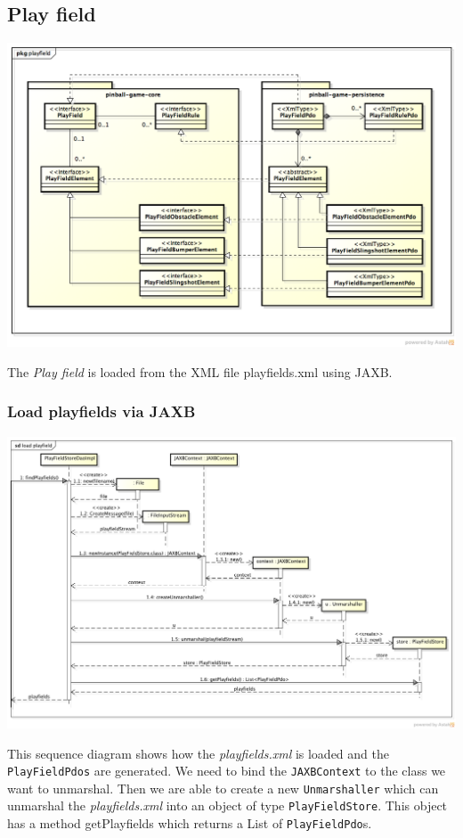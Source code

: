 \documentclass[fontsize=12pt,
               paper=a4,
               twoside=false,
               parskip=half,
               ]{scrartcl}
\begin{document}
\subsection{Play field}
\includegraphics[width=15.5cm]{./img/persistence-playfield.png}

The \emph{Play field} is loaded from the XML file playfields.xml using JAXB.

\subsubsection{Load playfields via JAXB}
\includegraphics[width=15.5cm]{./img/jaxb-load-playfield-sd.png}

This sequence diagram shows how the \emph{playfields.xml} is loaded and the \texttt{PlayFieldPdos} are generated.
We need to bind the \texttt{JAXBContext} to the class we want to unmarshal. Then we are able to create a new \texttt{Unmarshaller} which can unmarshal the \emph{playfields.xml} into an object of type \texttt{PlayFieldStore}. This object has a method getPlayfields which returns a List of \texttt{PlayFieldPdo}s.
\end{document}
